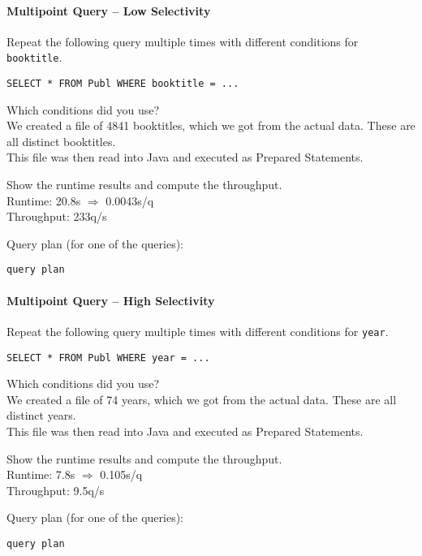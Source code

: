 \documentclass[11pt]{scrartcl}
\begin{document}
\paragraph{Multipoint Query -- Low Selectivity}

Repeat the following query multiple times with different conditions for {\tt booktitle}.

{\small
\begin{verbatim}
SELECT * FROM Publ WHERE booktitle = ...
\end{verbatim}
}

\noindent
Which conditions did you use?\\
We created a file of 4841 booktitles, which we got from the actual data. These are all distinct booktitles.\\
This file was then read into Java and executed as Prepared Statements.

\smallskip\noindent
Show the runtime results and compute the throughput.\\
Runtime: 20.8s $\Rightarrow$ 0.0043s/q\\
Throughput: 233q/s

\smallskip\noindent
Query plan (for one of the queries):
{\small
\begin{verbatim}
query plan
\end{verbatim}
}


\paragraph{Multipoint Query -- High Selectivity}

Repeat the following query multiple times with different conditions for {\tt year}.

{\small
\begin{verbatim}
SELECT * FROM Publ WHERE year = ...
\end{verbatim}
}

\noindent
Which conditions did you use?\\
We created a file of 74 years, which we got from the actual data. These are all distinct years.\\
This file was then read into Java and executed as Prepared Statements.

\smallskip\noindent
Show the runtime results and compute the throughput.\\
Runtime: 7.8s $\Rightarrow$ 0.105s/q\\
Throughput: 9.5q/s

\smallskip\noindent
Query plan (for one of the queries):
{\small
\begin{verbatim}
query plan
\end{verbatim}
}
\end{document}
